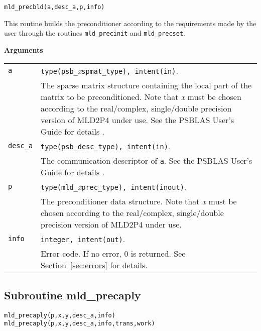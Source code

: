 \begin{center}
\verb|mld_precbld(a,desc_a,p,info)|\\
\end{center}

\noindent
This routine builds the preconditioner according to the requirements made by
the user through the routines \verb|mld_precinit| and \verb|mld_precset|.

{\baselineskip\noindent\large\bfseries Arguments}

\begin{tabular}{p{1.2cm}p{12cm}}
\verb|a|      & \verb|type(psb_|\emph{x}\verb|spmat_type), intent(in)|. \\
              & The sparse matrix structure containing the local part of the
                matrix to be preconditioned. Note that \emph{x} must be chosen according
                to the real/complex, 
single/double precision version of MLD2P4 under use.
                See the PSBLAS User's Guide for details \cite{PSBLASGUIDE}.\\
\verb|desc_a| & \verb|type(psb_desc_type), intent(in)|. \\
              & The communication descriptor of \verb|a|. See the PSBLAS User's Guide for
                details \cite{PSBLASGUIDE}.\\
\verb|p|      & \verb|type(mld_|\emph{x}\verb|prec_type), intent(inout)|.\\
              & The preconditioner data structure. Note that \emph{x} must be chosen according
                to the real/complex, single/double precision version of MLD2P4 under use.\\
\verb|info|   & \verb|integer, intent(out)|.\\
              & Error code. If no error, 0 is returned. See Section~\ref{sec:errors} for details.\\
\end{tabular}

\clearpage
\subsection{Subroutine mld\_precaply\label{sec:precaply}}

\begin{center}
\verb|mld_precaply(p,x,y,desc_a,info)|\\
\verb|mld_precaply(p,x,y,desc_a,info,trans,work)|\\
\end{center}

